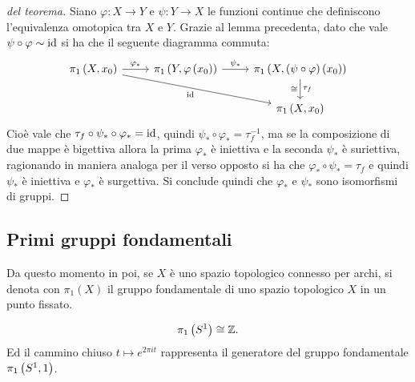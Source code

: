 \documentclass[]{article}
\begin{document}
\begin{proof} [del teorema] \nl
    Siano $\varphi: X \to Y$ e $\psi: Y \to X$ le funzioni continue che definiscono l'equivalenza omotopica tra $X$ e $Y$. \nl
    Grazie al lemma precedenta, dato che vale $\psi \circ \varphi \sim \mathrm{id}$ si ha che il seguente diagramma commuta:
    \[
    \begin{tikzcd}
        {\pi_1\left(X, x_0 \right)} & {\pi_1\left(Y, \varphi\left(x_0\right) \right)} & {\pi_1\left(X, (\psi \circ \varphi)\left(x_0\right) \right)} \\
        && {\pi_1\left(X, x_0 \right)}
        \arrow["{\varphi_*}", from=1-1, to=1-2]
        \arrow["\id"', from=1-1, to=2-3]
        \arrow["{\psi_*}", from=1-2, to=1-3]
        \arrow["{\tau_f}" right, "{\cong}" left, from=1-3, to=2-3]
    \end{tikzcd}
    \]
    Cio\`e vale che $ \tau_f \circ \psi_* \circ \varphi_* = \mathrm{id}$, quindi $\psi_* \circ \varphi_* = \tau_f^{-1}$, ma se la composizione di due mappe
    \`e bigettiva allora la prima $\varphi_*$ \`e iniettiva e la seconda $\psi_*$ \`e suriettiva, ragionando in maniera analoga
    per il verso opposto si ha che $\varphi_* \circ \psi_* = \tau_f$ e quindi $\psi_*$ \`e iniettiva e $\varphi_*$ \`e surgettiva. \nl
    Si conclude quindi che $\varphi_*$ e $\psi_*$ sono isomorfismi di gruppi.
         
\end{proof}

\subsection{Primi gruppi fondamentali}

Da questo momento in poi, se $X$ \`e uno spazio topologico connesso per archi, si denota con $\pi_1(X)$ il gruppo fondamentale di uno spazio topologico $X$ in un punto fissato.

\begin{theorem}  \nl
    \[
        \pi_1\left(S^{1} \right) \cong \mathbb{Z}.
    \]
    Ed il cammino chiuso $t \mapsto e^{2\pi i t}$ rappresenta il generatore del gruppo fondamentale $\pi_1\left(S^{1}, 1\right)$.
\end{theorem}
\end{document}

